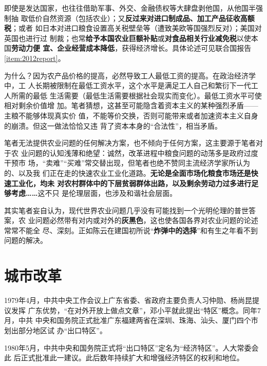 即使是发达国家，也往往借助军事、外交、金融债权等大肆盘剥他国，从他国半强制抽
取低价自然资源（包括农业）；又\textbf{反过来对进口制成品、加工产品征收高额税}；或者
如日本对进口粮食设置高关税壁垒等（遭致美欧等国强烈反对）；美国对英国也进行过
制裁；也常\textbf{给予本国农业巨额补贴}或\textbf{对食品相关行业减免税}以使本国\textbf{劳动力便
  宜、企业经营成本降低}，获得经济增长。具体论述可见联合国报告\cref{item:2012report}。

为什么？因为农产品价格的提高，必然导致工人最低工资的提高。在政治经济学中，工
人长期被限制在最低工资水平，这个水平是满足工人自己和繁衍下一代工人所需的最低
生活需要（最低生活需要根据社会现实而变化）。最低工资水平可使相对剩余价值增
加。笔者猜想，这甚至可能隐含着资本主义的某种强烈矛盾——主粮不能够体现真实价
值，不能等价交换，否则可能带来或者加速资本主义自身的崩溃。但这一做法恰恰又违
背了资本本身的“合法性”，相当矛盾。

笔者无法提供农业问题的任何解决方案，也不倾向于任何方案，这主要源于笔者对于农
业问题的认知浅薄和绝望：诚然，改革进程中粮食问题的动荡多是政府过度干预市
场，“卖难”“买难”常交替出现，但笔者也绝不赞同主流经济学家所认为的、以及我
们正在走的快速农业工业化道路。\textbf{无论是全面市场化粮食市场还是快速工业化，均未
  对农村群体中的下层贫弱群体出路，以及剩余劳动力过多进行足够考虑……}这不只
是伦理层面，也涉及和谐社会层面。

其实笔者妄自认为，现代世界农业问题几乎没有可能找到一个光明伦理的普世答案，农
业问题必然带有对内或对外的\textbf{灰黑色}，这也使各国各界对农业问题的论述常常不能全
尽、深刻。正如陈云在建国初所说“\textbf{炸弹中的选择}”和有生之年看不到问题的解决。



\section{城市改革}

1979年4月，中共中央工作会议上广东省委、省政府主要负责人习仲勋、杨尚昆提议发挥
广东优势，“在对外开放上做点文章”，邓小平就此提出“特区”概念。同年7月，中共
中央和国务院正式批准广东福建两省在深圳、珠海、汕头、厦门四个市划出部分地区试
办“出口特区”。

1980年5月，中共中央和国务院正式将“出口特区”定名为“经济特区”。人大常委会此
后正式批准此一建议。此后数年持续扩大和增强经济特区的权利和地位。

